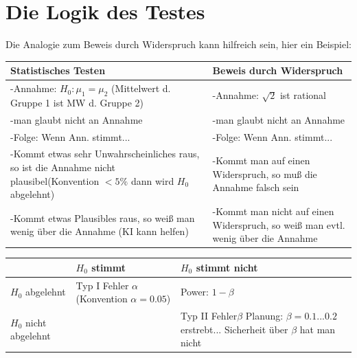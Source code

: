 \documentclass[10pt]{report}
\theoremstyle{definition}
\begin{document}
\section{Die Logik des Testes}
Die Analogie zum Beweis durch Widerspruch kann hilfreich sein, hier ein Beispiel:\\
\begin{tabularx}{\linewidth}{|L|L|}  
	\hline
	Statistisches Testen & Beweis durch Widerspruch \\ \hline
	-Annahme: $H_0: \mu_1 = \mu_2$ (Mittelwert d. Gruppe 1 ist MW d. Gruppe 2)  & -Annahme: $\sqrt{2}$ ist rational \\
	-man glaubt nicht an Annahme & -man glaubt nicht an Annahme \\
	-Folge: Wenn Ann. stimmt... & -Folge: Wenn Ann. stimmt... \\
	-Kommt etwas sehr Unwahrscheinliches raus, so ist die Annahme nicht plausibel(Konvention $< 5\%$ dann wird $H_0$ abgelehnt) & -Kommt man auf einen Widerspruch, so muß die Annahme falsch sein \\
	-Kommt etwas Plausibles raus, so weiß man wenig über die Annahme (KI kann helfen) & -Kommt man nicht auf einen Widerspruch, so weiß man evtl. wenig über die Annahme \\ \hline
\end{tabularx}
\begin{tabularx}{\linewidth}{|L|L|L|}
	\hline
	& $H_0$ stimmt & $H_0$ stimmt nicht \\ \hline
	$H_0$ abgelehnt & Typ I Fehler \newline $\alpha$ \newline (Konvention $\alpha = 0.05$) & \dSmiley \newline Power: $1-\beta$ \\ \hline
	$H_0$ nicht abgelehnt & \dSmiley & Typ II Fehler\newline $\beta$ \newline Planung: $\beta=0.1 ... 0.2$ erstrebt... \newline Sicherheit über $\beta$ hat man nicht \\ \hline
\end{tabularx}
\end{document}
